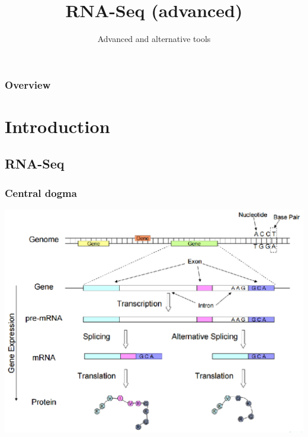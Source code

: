 \documentclass{beamer}			  %
\title[RNA-Seq (advanced)]{RNA-Seq (advanced)}
\subtitle{Advanced and alternative tools}
\begin{document}
\begin{frame}
	\titlepage %
\end{frame}

\begin{frame}
	\frametitle{Overview} %
	\begin{scriptsize}
		\tableofcontents
	\end{scriptsize}
\end{frame}

\section{Introduction} %
\subsection{RNA-Seq}
\begin{frame}
	\frametitle{Central dogma}
	\begin{center}
		\includegraphics[height=0.8\textheight]{figures/dge_00ap.png}
	\end{center}
\end{frame}
\end{document}
